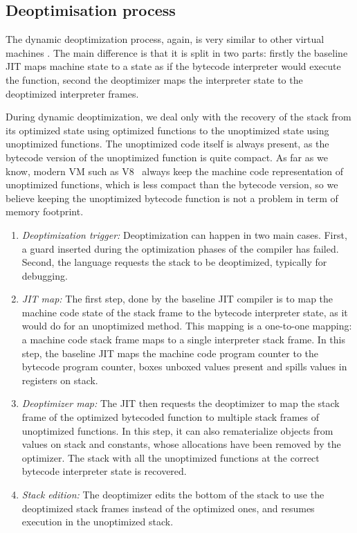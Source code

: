 \documentclass[a4paper,12pt,twoside]{../includes/ThesisStyle}
\begin{document}
\subsection {Deoptimisation process}

The dynamic deoptimization process, again, is very similar to other virtual machines \cite{Fin03a, Holz92a}. The main difference is that it is split in two parts: firstly the baseline JIT maps  machine state to a state as if the bytecode interpreter would execute the function, second the deoptimizer maps the interpreter state to the deoptimized interpreter frames.

During dynamic deoptimization, we deal only with the recovery of the stack from its optimized state using optimized functions to the  unoptimized state using unoptimized functions. The unoptimized code itself is always present, as the bytecode version of the  unoptimized function is quite compact. As far as we know, modern VM such as V8~\cite{V8} always keep the machine code representation of unoptimized functions, which is less compact than the bytecode version, so we believe keeping the unoptimized bytecode function is not a problem in term of memory footprint.

\begin{enumerate}
\item \emph{Deoptimization trigger:} Deoptimization can happen in two main cases. First, a guard inserted during the optimization phases of the compiler has failed. Second, the language requests the stack to be deoptimized, typically for debugging.
\item \emph{JIT map:} The first step, done by the baseline JIT compiler is to map the machine code state of the stack frame to the bytecode interpreter state, as it would do for an unoptimized method. This mapping is a one-to-one mapping: a machine code stack frame maps to a single interpreter stack frame. In this step, the baseline JIT maps the machine code program counter to the bytecode program counter, boxes unboxed values present and spills values in registers on stack.
\item \emph{Deoptimizer map:} The JIT then requests the deoptimizer to map the stack frame of the optimized bytecoded function to multiple stack frames of unoptimized functions. In this step, it can also rematerialize objects from values on stack and constants, whose allocations have been removed by the optimizer. The stack with all the unoptimized functions at the correct bytecode interpreter state is recovered.
\item \emph{Stack edition:}
The deoptimizer edits the bottom of the stack to use the deoptimized stack frames instead of the optimized ones, and resumes execution in the unoptimized stack.
\end{enumerate}
\end{document}
